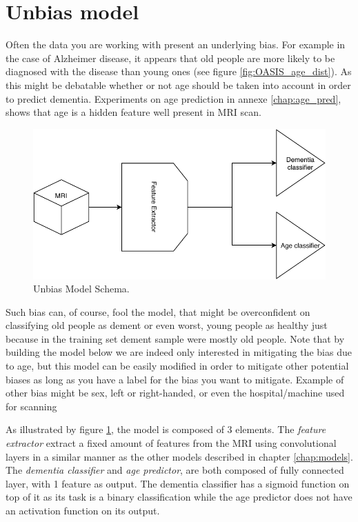 \section{Unbias model}
\label{sec:unbias_model}

Often the data you are working with present an underlying bias. For example in the case of Alzheimer disease, it appears that old people are more likely to be diagnosed with the disease than young ones (see figure \ref{fig:OASIS_age_dist}). As this might be debatable whether or not age should be taken into account in order to predict dementia. Experiments on age prediction in annexe \ref{chap:age_pred}, shows that age is a hidden feature well present in MRI scan.

\begin{figure}
 \centering
 \includegraphics[width=.9\linewidth]{figures/models/Unbias_model.pdf}
 \captionsetup{width=.9\linewidth}
 \caption[UnbiasModelSchema]{Unbias Model Schema.}
 \label{fig:unbias_model_schema}
\end{figure}

Such bias can, of course, fool the model, that might be overconfident on classifying old people as dement or even worst, young people as healthy just because in the training set dement sample were mostly old people.
Note that by building the model below we are indeed only interested in mitigating the bias due to age, but this model can be easily modified in order to mitigate other potential biases as long as you have a label for the bias you want to mitigate. Example of other bias might be sex, left or right-handed, or even the hospital/machine used for scanning


As illustrated by figure \ref{fig:unbias_model_schema}, the model is composed of 3 elements. The \textit{feature extractor} extract a fixed amount of features from the MRI using convolutional layers in a similar manner as the other models described in chapter \ref{chap:models}. The \textit{dementia classifier} and \textit{age predictor}, are both composed of fully connected layer, with 1 feature as output. The dementia classifier has a sigmoid function on top of it as its task is a binary classification while the age predictor does not have an activation function on its output.


